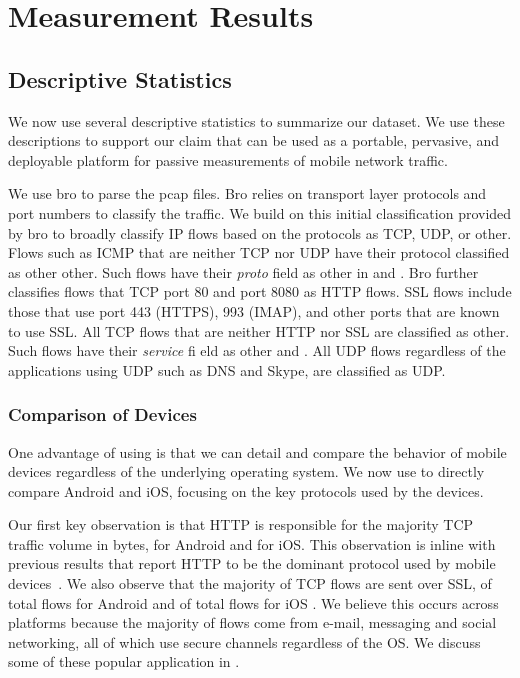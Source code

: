 \section{Measurement Results}
\label{sec:measurements}


\subsection{Descriptive Statistics}  

We now use several descriptive statistics to summarize our \moball dataset.
We use these descriptions to support our claim that \platname can be used as a portable, pervasive, and deployable platform for passive measurements of mobile network traffic. 

We use bro to parse the pcap files. 
Bro relies on transport layer protocols and port numbers to classify  the traffic.
We build on this initial classification provided by bro to broadly classify IP flows based on the protocols as TCP, UDP, or other. 
Flows such as ICMP that are neither TCP nor UDP have their protocol classified as other other. 
Such flows have their \emph{proto} field as other in  and . 
Bro further classifies flows that TCP port 80 and port 8080 as HTTP flows. 
SSL flows include those that use port 443 (HTTPS), 993 (IMAP), and other ports that  are known to use SSL. 
All TCP flows that are neither HTTP nor SSL are classified as other. 
Such flows have their \emph{service} fi eld as other  and . 
All UDP flows regardless of the applications using UDP such as DNS and Skype, are classified as UDP. 

\subsubsection{Comparison of Devices} 
One advantage of using \platname is that we can detail and compare the behavior of mobile devices regardless of the underlying operating system. 
We now use  to directly compare Android and iOS, focusing on the key protocols used by the devices. 

Our first key observation is that HTTP is responsible for the majority TCP traffic volume in bytes,  for Android and  for iOS. 
This observation is inline with previous results that report HTTP to be the dominant protocol used by mobile devices~\cite{falaki:mobileusage, maier:mobtraffic}. 
We also observe that the majority of TCP flows are sent over SSL,   of total flows for Android and  of total flows for iOS . 
We believe this occurs across platforms because the majority of flows come from e-mail, messaging and social networking, all of which use secure channels regardless of the OS. 
We discuss some of these popular application in .

